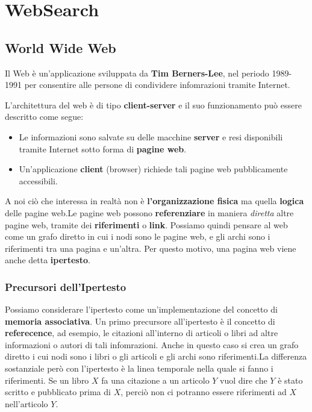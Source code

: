 \chapter{WebSearch}

\section{World Wide Web}

Il Web è un'applicazione sviluppata da \textbf{Tim Berners-Lee}, nel periodo 1989-1991 per consentire alle persone di condividere infomrazioni tramite Internet.

L'architettura del web è di tipo \textbf{client-server} e il suo funzionamento può essere descritto come segue:

\begin{itemize}
    \item Le informazioni sono salvate su delle macchine \textbf{server} e resi disponibili tramite Internet sotto forma di \textbf{pagine web}.
    \item Un'applicazione \textbf{client} (browser) richiede tali pagine web pubblicamente accessibili.
\end{itemize}

A noi ciò che interessa in realtà non è \textbf{l'organizzazione fisica} ma quella \textbf{logica} delle pagine web.Le pagine web possono \textbf{referenziare} in maniera \textit{diretta} altre pagine web, tramite dei \textbf{riferimenti} o \textbf{link}. Possiamo quindi pensare al web come un grafo diretto in cui i nodi sono le pagine web, e gli archi sono i riferimenti tra una pagina e un'altra. Per questo motivo, una pagina web viene anche detta \textbf{ipertesto}.

\subsection{Precursori dell'Ipertesto}

Possiamo considerare l'ipertesto come un'implementazione del concetto di \textbf{memoria associativa}. Un primo precursore all'ipertesto è il concetto di \textbf{referecence}, ad esempio,  le citazioni all'interno di articoli o libri ad altre informazioni o autori di tali infomrazioni. Anche in questo caso si crea un grafo diretto i cui nodi sono i libri o gli articoli e gli archi sono  riferimenti.La differenza sostanziale però con l'ipertesto è la linea temporale nella quale si fanno i riferimenti. Se un libro $X$ fa una citazione a un articolo $Y$ vuol dire che $Y$ è stato scritto e pubblicato prima di $X$, perciò non ci potranno essere riferimenti ad $X$ nell'articolo $Y$.

